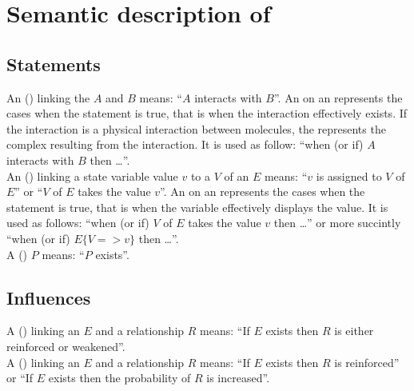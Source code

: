 \section{Semantic description of \ERs}


\subsection{Statements}

An  () linking the  $A$ and $B$ means: ``$A$ interacts with $B$''. An  on an  represents the cases when the statement is true, that is when the interaction effectively exists. If the interaction is a physical interaction between molecules, the  represents the complex resulting from the interaction. It is used as follow: ``when (or if) $A$ interacts with $B$ then \ldots''.\\[\baselineskip]

\noindent
An  () linking a state variable value $v$ to a  $V$ of an  $E$ means: ``$v$ is assigned to $V$ of $E$'' or ``$V$ of $E$ takes the value $v$''. An  on an  represents the cases when the statement is true, that is when the variable effectively displays the value. It is used as follows: ``when (or if) $V$ of $E$ takes the value $v$ then \ldots'' or more succintly ``when (or if) $E\{V => v\}$ then \ldots''.\\[\baselineskip]

\noindent
A  () $P$ means: ``$P$ exists''.\\[\baselineskip]

\subsection{Influences}

A  () linking an  $E$ and a relationship $R$ means: ``If $E$ exists then $R$ is either reinforced or weakened''. 
\\[\baselineskip]

\noindent
A  () linking an  $E$ and a relationship $R$ means: ``If $E$ exists then $R$ is reinforced'' or ``If $E$ exists then the probability of $R$ is increased''. 
\\[\baselineskip]

